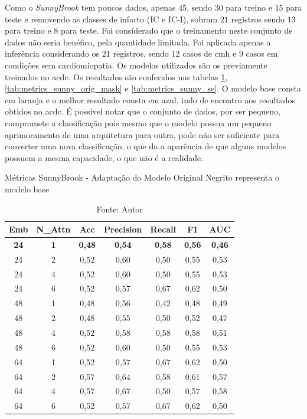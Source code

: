 Como o \textit{SunnyBrook} tem poucos dados, apenas $45$, sendo $30$ para treino e $15$ para teste e removendo as classes de infarto (IC e IC-I), sobram $21$ registros sendo $13$ para treino e $8$ para teste. Foi considerado que o treinamento neste conjunto de dados não seria benéfico, pela quantidade limitada. Foi aplicada apenas a inferência considerando os $21$ registros, sendo $12$ casos de \gls{cmh} e $9$ casos em condições sem cardiomiopatia. Os modelos utilizados são os previamente treinados no \gls{acdc}. Os resultados são conferidos nas tabelas \ref{tab:metrics_sunny_orig}, \ref{tab:metrics_sunny_orig_mask} e \ref{tab:metrics_sunny_se}. O modelo base consta em laranja e o melhor resultado consta em azul, indo de encontro aos resultados obtidos no \gls{acdc}. É possível notar que o conjunto de dados, por ser pequeno, compromete a classificação pois mesmo que o modelo possua um pequeno aprimoramento de uma arquitetura para outra, pode não ser suficiente para converter uma nova classificação, o que da a aparência de que alguns modelos possuem a mesma capacidade, o que não é a realidade.


\begin{table}[htbp]
\centering
\caption{Métricas SunnyBrook - Adaptação do Modelo Original
\newline Negrito representa o modelo base}
\begin{tabular}{ccccccc}
\toprule
\textbf{Emb} & \textbf{N\_Attn} & \textbf{Acc} & \textbf{Precision} & \textbf{Recall} & \textbf{F1} & \textbf{AUC} \\
\midrule
\textbf{24} & \textbf{1} & \textbf{0,48} & \textbf{0,54} & \textbf{0,58} & \textbf{0,56} & \textbf{0,46} \\
24 & 2 & 0,52 & 0,60 & 0,50 & 0,55 & 0,53 \\
24 & 4 & 0,52 & 0,60 & 0,50 & 0,55 & 0,53 \\
24 & 6 & 0,52 & 0,57 & 0,67 & 0,62 & 0,50 \\
48 & 1 & 0,48 & 0,56 & 0,42 & 0,48 & 0,49 \\
48 & 2 & 0,48 & 0,55 & 0,50 & 0,52 & 0,47 \\
48 & 4 & 0,52 & 0,58 & 0,58 & 0,58 & 0,51 \\
48 & 6 & 0,52 & 0,60 & 0,50 & 0,55 & 0,53 \\
64 & 1 & 0,52 & 0,57 & 0,67 & 0,62 & 0,50 \\
64 & 2 & 0,57 & 0,64 & 0,58 & 0,61 & 0,57 \\
64 & 4 & 0,57 & 0,67 & 0,50 & 0,57 & 0,58 \\
64 & 6 & 0,52 & 0,57 & 0,67 & 0,62 & 0,50 \\
\bottomrule
\end{tabular}
\caption*{Fonte: Autor}
\label{tab:metrics_sunny_orig}
\end{table}


